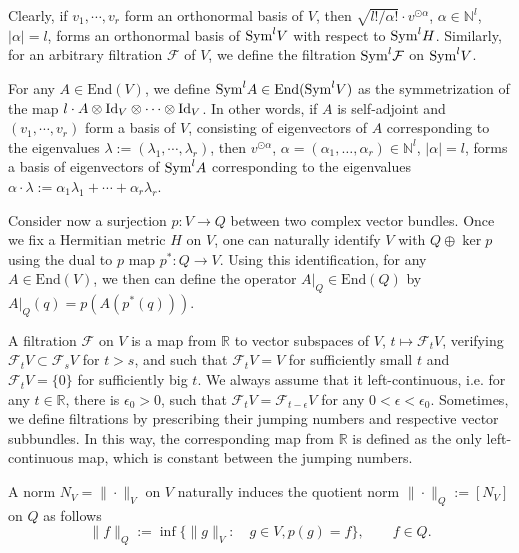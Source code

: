 \documentclass[12pt]{article}
\numberwithin{equation}{section}
\theoremstyle{theorem}
\theoremstyle{definition}
\theoremstyle{remark}
\newcommand{\real}{\mathbb{R}}
\newcommand{\nat}{\mathbb{N}}
\newcommand{\enmr}[1]{\text{End}{(#1)}}
\begin{document}
	Clearly, if $v_1, \cdots, v_r$ form an orthonormal basis of $V$, then $\sqrt{l! / \alpha!} \cdot v^{\odot \alpha}$, $\alpha \in \nat^l$, $|\alpha| = l$, forms an orthonormal basis of ${\rm{Sym}}^l V$ with respect to ${\rm{Sym}}^l H$.
	Similarly, for an arbitrary filtration $\mathcal{F}$ of $V$, we define the filtration ${\rm{Sym}}^l \mathcal{F}$ on ${\rm{Sym}}^l V$.
	\par 
	For any $A \in \enmr{V}$, we define ${\rm{Sym}}^l A \in \enmr{{\rm{Sym}}^l V}$ as the symmetrization of the map $l \cdot A \otimes {\rm{Id}}_V \otimes \cdots \otimes {\rm{Id}}_V$.
	In other words, if $A$ is self-adjoint and $(v_1, \cdots, v_r)$ form a basis of $V$, consisting of eigenvectors of $A$ corresponding to the eigenvalues $\lambda := (\lambda_1, \cdots, \lambda_r)$, then $v^{\odot \alpha}$, $\alpha = (\alpha_1, \ldots, \alpha_r) \in \nat^l$, $|\alpha| = l$, forms a basis of eigenvectors of ${\rm{Sym}}^l A$ corresponding to the eigenvalues $\alpha \cdot \lambda := \alpha_1 \lambda_1 + \cdots + \alpha_r \lambda_r$.
	\par 
	Consider now a surjection $p : V \to Q$ between two complex vector bundles.
	Once we fix a Hermitian metric $H$ on $V$, one can naturally identify $V$ with $Q \oplus \ker p$ using the dual to $p$ map $p^* : Q \to V$.
	Using this identification, for any $A \in \enmr{V}$, we then can define the operator $A|_Q \in \enmr{Q}$ by $A|_Q (q) = p(A( p^* (q)))$.
	\par 
	A filtration $\mathcal{F}$ on $V$ is a map from $\real$ to vector subspaces of $V$, $t \mapsto \mathcal{F}_t V$, verifying $\mathcal{F}_t V \subset \mathcal{F}_s V$ for $t > s$, and such that $\mathcal{F}_t V  = V$ for sufficiently small $t$ and $\mathcal{F}_t V = \{0\}$ for sufficiently big $t$.
	We always assume that it left-continuous, i.e. for any $t \in \real$, there is $\epsilon_0 > 0$, such that $\mathcal{F}_t V = \mathcal{F}_{t - \epsilon} V $ for any $0 < \epsilon < \epsilon_0$.
	Sometimes, we define filtrations by prescribing their jumping numbers and respective vector subbundles. 
	In this way, the corresponding map from $\real$ is defined as the only left-continuous map, which is constant between the jumping numbers.
	\par 
	A norm $N_V = \| \cdot \|_V$ on $V$ naturally induces the quotient norm $\| \cdot \|_Q := [N_V]$ on $Q$ as follows
	\begin{equation}\label{eq_defn_quot_norm}
		\| f \|_Q
		:=
		\inf \big \{
		 \| g \|_V
		 :
		 \quad
		 g \in V, 
		 p(g) = f
		\big\},
		\qquad f \in Q.
	\end{equation}
\end{document}
